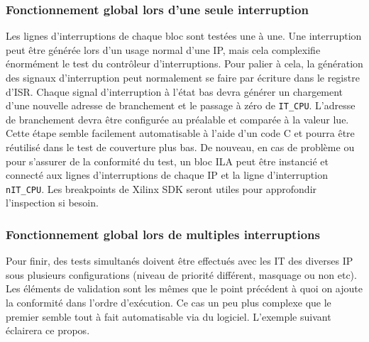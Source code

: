 \subsubsection*{Fonctionnement global lors d'une seule interruption}

Les lignes d'interruptions de chaque bloc sont testées une à une.
Une interruption peut être générée lors d'un usage normal d'une IP, mais cela complexifie énormément le test du contrôleur d'interruptions.
Pour palier à cela, la génération des signaux d'interruption peut normalement se faire par écriture dans le registre d'ISR.
Chaque signal d'interruption à l'état bas devra générer un chargement d'une nouvelle adresse de branchement et le passage à zéro de \texttt{IT\_CPU}.
L'adresse de branchement devra être configurée au préalable et comparée à la valeur lue.
Cette étape semble facilement automatisable à l'aide d'un code C et pourra être réutilisé dans le test de couverture plus bas.
De nouveau, en cas de problème ou pour s'assurer de la conformité du test, un bloc ILA peut être instancié et connecté aux lignes d'interruptions de chaque IP et la ligne d'interruption \texttt{nIT\_CPU}.
Les breakpoints de Xilinx SDK seront utiles pour approfondir l'inspection si besoin.

\subsubsection*{Fonctionnement global lors de multiples interruptions}

Pour finir, des tests simultanés doivent être effectués avec les IT des diverses IP sous plusieurs configurations (niveau de priorité différent, masquage ou non etc).
Les éléments de validation sont les mêmes que le point précédent à quoi on ajoute la conformité dans l'ordre d'exécution.
Ce cas un peu plus complexe que le premier semble tout à fait automatisable via du logiciel.
L'exemple suivant éclairera ce propos. 

